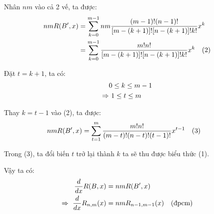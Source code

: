 \documentclass[main.tex]{subfiles}
\begin{document}
Nhân $nm$ vào cả 2 vế, ta được:
\begin{equation*}
\begin{aligned}
nmR(B',x) &= \sum_{k=0}^{m-1}{nm\frac{(m-1)!(n-1)!}{\left[m-(k+1)\right]![n-(k+1)]!k!}x^{k}}\\
&= \sum_{k=0}^{m-1}{\frac{m!n!}{\left[m-(k+1)\right]![n-(k+1)]!k!}x^{k}} \quad \text{(2)}
\end{aligned}
\end{equation*}

Đặt $t = k + 1$, ta có:
\begin{equation*}
\begin{aligned}
& 0 \le k \le m-1 \\
\Rightarrow &\ 1 \le t \le m
\end{aligned}
\end{equation*}

Thay $k = t - 1$ vào (2), ta được:
\begin{equation*}
\begin{aligned}
nmR(B',x) &= \sum_{t=1}^{m}{\frac{m!n!}{(m-t)!(n-t)!(t-1)!}x^{t-1}} \quad \text{(3)}
\end{aligned}
\end{equation*}

Trong (3), ta đổi biến $t$ trở lại thành $k$ ta sẽ thu được biểu thức (1).

Vậy ta có:
\begin{equation*}
\begin{aligned}
\frac{d}{dx}R(B,x) &=  nmR(B',x) \\
\Rightarrow\ \frac{d}{dx}R_{n,m}(x) &= nmR_{n-1,m-1}(x) \quad \text{(đpcm)}
\end{aligned}
\end{equation*}
\end{document}
